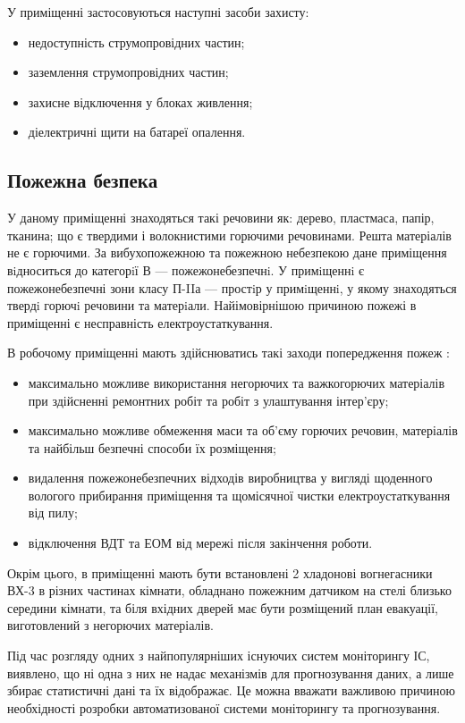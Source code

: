 \documentclass{thesis_utf8}
\begin{document}
У приміщенні застосовуються наступні засоби захисту:
\begin{itemize}
    \item недоступність струмопровідних частин;
    \item заземлення струмопровідних частин;
    \item захисне відключення у блоках живлення;
    \item діелектричні щити на батареї опалення.
\end{itemize}

\subsection{Пожежна безпека}
У даному приміщенні знаходяться такі речовини як: дерево, пластмаса, папір, тканина; що є твердими і волокнистими горючими речовинами. Решта матеріалів не є горючими.
За вибухопожежною та пожежною небезпекою \cite{OOP6} дане приміщення вiдноситься до категорiї В --- пожежонебезпечнi. У примiщеннi є пожежонебезпечні зони класу П-IIа --- простiр у
примiщеннi, у якому знаходяться твердi горючi речовини та матерiали.
Найімовірнішою причиною пожежі в приміщенні є несправність електроустаткування.

В робочому приміщенні мають здійснюватись такі заходи попередження пожеж \cite{OOP7}:
\begin{itemize}
    \item максимально можливе використання негорючих та важкогорючих матеріалів при здійсненні ремонтних робіт та робіт з улаштування інтер'єру;
    \item максимально можливе обмеження маси та об’єму горючих речовин, матеріалів та найбільш безпечні способи їх розміщення;
    \item видалення пожежонебезпечних відходів виробництва у вигляді щоденного вологого прибирання приміщення та щомісячної чистки електроустаткування від пилу;
    \item відключення ВДТ та ЕОМ від мережі після закінчення роботи.
\end{itemize}

Окрім цього, в приміщенні мають бути встановлені 2 хладонові вогнегасники ВХ-3 в різних частинах кімнати, обладнано пожежним датчиком  на стелі близько середини кімнати, та біля вхідних дверей має бути розміщений план евакуації, виготовлений з негорючих матеріалів.

\conclusion
Під час розгляду одних з найпопулярніших існуючих систем моніторингу ІС, виявлено, що ні одна з них не надає механізмів для прогнозування даних, а лише збирає статистичні дані та їх відображає. Це можна вважати важливою причиною необхідності розробки автоматизованої системи моніторингу та прогнозування.
\end{document}

